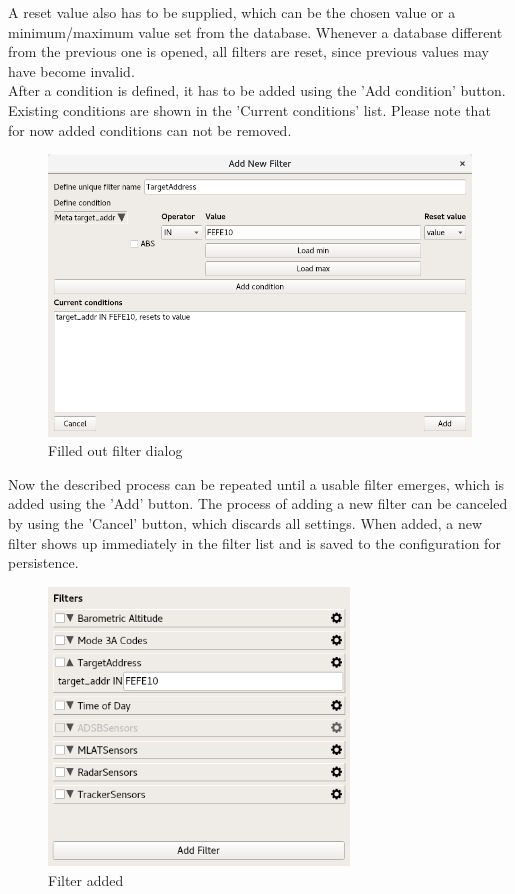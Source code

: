A reset value also has to be supplied, which can be the chosen value or a minimum/maximum value set from the database.  Whenever a database different from the previous one is opened, all filters are reset, since previous values may have become invalid.\\

After a condition is defined, it has to be added using the 'Add condition' button. Existing conditions are shown in the 'Current conditions' list. Please note that for now added conditions can not be removed.

\begin{figure}[H]
  \center
    \includegraphics[width=14cm,frame]{figures/filter_add2.png}
  \caption{Filled out filter dialog}
  \label{fig:filter_add2}
\end{figure}

Now the described process can be repeated until a usable filter emerges, which is added using the 'Add'
button. The process of adding a new filter can be canceled by using the 'Cancel' button, which discards all
settings. When added, a new filter shows up immediately in the filter list and is saved to the configuration
for persistence.

\begin{figure}[H]
  \center
    \includegraphics[width=8cm,frame]{figures/filter_add3.png}
  \caption{Filter added}
  \label{fig:filter_add3}
\end{figure}

